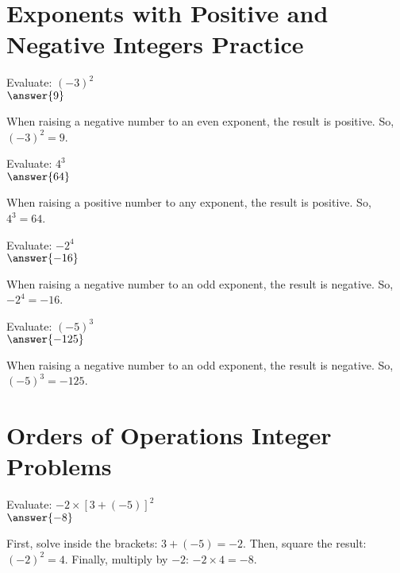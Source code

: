 \documentclass{ximera}
\begin{document}


\section*{Exponents with Positive and Negative Integers Practice}

\begin{problem}
Evaluate: $(-3)^2$\\
$\answer{9}$
\begin{feedback}
When raising a negative number to an even exponent, the result is positive. So, $(-3)^2 = 9$.
\end{feedback}
\end{problem}

\begin{problem}
Evaluate: $4^3$\\
$\answer{64}$
\begin{feedback}
When raising a positive number to any exponent, the result is positive. So, $4^3 = 64$.
\end{feedback}
\end{problem}

\begin{problem}
Evaluate: $-2^4$\\
$\answer{-16}$
\begin{feedback}
When raising a negative number to an odd exponent, the result is negative. So, $-2^4 = -16$.
\end{feedback}
\end{problem}

\begin{problem}
Evaluate: $(-5)^3$\\
$\answer{-125}$
\begin{feedback}
When raising a negative number to an odd exponent, the result is negative. So, $(-5)^3 = -125$.
\end{feedback}
\end{problem}



\section*{Orders of Operations Integer Problems}

\begin{problem}
Evaluate: $-2 \times [3 + (-5)]^2$\\
$\answer{-8}$
\begin{feedback}
First, solve inside the brackets: $3 + (-5) = -2$. Then, square the result: $(-2)^2 = 4$. Finally, multiply by $-2$: $-2 \times 4 = -8$.
\end{feedback}
\end{problem}
\end{document}
